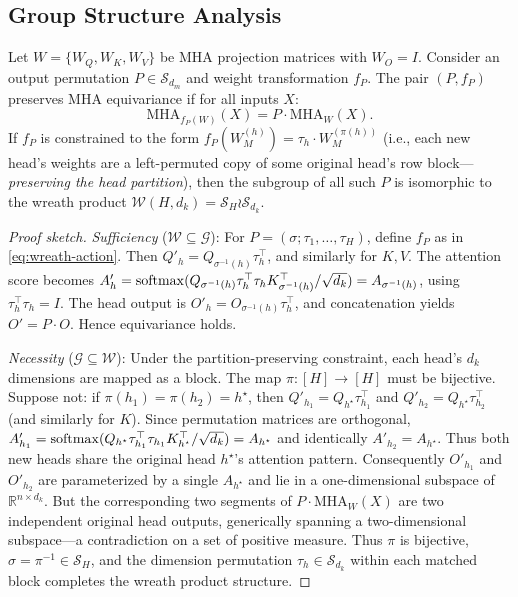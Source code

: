 \subsection{Group Structure Analysis}

\begin{theorem}\label{thm:symmetry-group}
Let $W = \{W_Q, W_K, W_V\}$ be MHA projection matrices with $W_O = I$. Consider an output permutation $P \in \mathcal{S}_{d_m}$ and weight transformation $f_P$. The pair $(P, f_P)$ preserves MHA equivariance if for all inputs $X$:
\begin{equation}\label{eq:equivariance-condition}
    \text{MHA}_{f_P(W)}(X) = P \cdot \text{MHA}_W(X).
\end{equation}
If $f_P$ is constrained to the form $f_P(W_M^{(h)}) = \tau_h \cdot W_M^{(\pi(h))}$ (i.e., each new head's weights are a left-permuted copy of some original head's row block---\emph{preserving the head partition}), then the subgroup of all such $P$ is isomorphic to the wreath product $\mathcal{W}(H, d_k) = \mathcal{S}_H \wr \mathcal{S}_{d_k}$.
\end{theorem}

\begin{proof}[Proof sketch]
\emph{Sufficiency} ($\mathcal{W} \subseteq \mathcal{G}$): For $P = (\sigma; \tau_1, \ldots, \tau_H)$, define $f_P$ as in \eqref{eq:wreath-action}. Then $Q'_h = Q_{\sigma^{-1}(h)} \tau_h^\top$, and similarly for $K, V$. The attention score becomes $A'_h = \operatorname{softmax}(Q_{\sigma^{-1}(h)}\tau_h^\top\tau_h K_{\sigma^{-1}(h)}^\top / \sqrt{d_k}) = A_{\sigma^{-1}(h)}$, using $\tau_h^\top\tau_h = I$. The head output is $O'_h = O_{\sigma^{-1}(h)}\tau_h^\top$, and concatenation yields $O' = P \cdot O$. Hence equivariance holds.

\emph{Necessity} ($\mathcal{G} \subseteq \mathcal{W}$): Under the partition-preserving constraint, each head's $d_k$ dimensions are mapped as a block. The map $\pi: [H] \to [H]$ must be bijective. Suppose not: if $\pi(h_1) = \pi(h_2) = h^\star$, then $Q'_{h_1} = Q_{h^\star} \tau_{h_1}^\top$ and $Q'_{h_2} = Q_{h^\star} \tau_{h_2}^\top$ (and similarly for $K$). Since permutation matrices are orthogonal, $A'_{h_1} = \operatorname{softmax}(Q_{h^\star} \tau_{h_1}^\top \tau_{h_1} K_{h^\star}^\top / \sqrt{d_k}) = A_{h^\star}$ and identically $A'_{h_2} = A_{h^\star}$. Thus both new heads share the original head $h^\star$'s attention pattern. Consequently $O'_{h_1}$ and $O'_{h_2}$ are parameterized by a single $A_{h^\star}$ and lie in a one-dimensional subspace of $\mathbb{R}^{n \times d_k}$. But the corresponding two segments of $P \cdot \text{MHA}_W(X)$ are two independent original head outputs, generically spanning a two-dimensional subspace---a contradiction on a set of positive measure. Thus $\pi$ is bijective, $\sigma = \pi^{-1} \in \mathcal{S}_H$, and the dimension permutation $\tau_h \in \mathcal{S}_{d_k}$ within each matched block completes the wreath product structure.
\end{proof}


